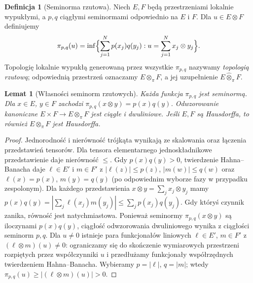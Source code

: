 \documentclass[11pt,a4paper]{article}
\numberwithin{equation}{section}
\theoremstyle{plain}
\newtheorem{lemat}[twierdzenie]{Lemat}
\theoremstyle{definition}
\newtheorem{definicja}[twierdzenie]{Definicja}
\theoremstyle{remark}
\begin{document}
\begin{definicja}[Seminorma rzutowa]
\label{def:pi-seminorm24}
Niech $E,F$ będą przestrzeniami lokalnie wypukłymi, a $p,q$
ciągłymi seminormami odpowiednio na $E$ i $F$. Dla
$u\in E\otimes F$ definiujemy
\[
 \pi_{p,q}(u)=\inf\Bigl\{\sum_{j=1}^N p(x_j)q(y_j):
 u=\sum_{j=1}^Nx_j\otimes y_j\Bigr\}.
\]
Topologię lokalnie wypukłą generowaną przez wszystkie
$\pi_{p,q}$ nazywamy \emph{topologią rzutową};
odpowiednią przestrzeń oznaczamy $E\otimes_\pi F$,
a jej uzupełnienie $E\widehat\otimes_\pi F$.
\end{definicja}

\begin{lemat}[Własności seminorm rzutowych]
\label{lem:pi-properties24}
Każda funkcja $\pi_{p,q}$ jest seminormą. Dla $x\in E$,
$y\in F$ zachodzi $\pi_{p,q}(x\otimes y)=p(x)q(y)$.
Odwzorowanie kanoniczne $E\times F\to E\otimes_\pi F$
jest ciągłe i dwuliniowe. Jeśli $E,F$ są Hausdorffa,
to również $E\otimes_\pi F$ jest Hausdorffa.
\end{lemat}
\begin{proof}
Jednorodność i nierówność trójkąta wynikają ze skalowania
oraz łączenia przedstawień tensorów. Dla tensora elementarnego
jednoskładnikowe przedstawienie daje nierówność $\le$.
Gdy $p(x)q(y)>0$, twierdzenie Hahna--Banacha daje
$\ell\in E'$ i $m\in F'$ z $|\ell(z)|\le p(z)$,
$|m(w)|\le q(w)$ oraz $\ell(x)=p(x)$, $m(y)=q(y)$
(po odpowiednim wyborze fazy w przypadku zespolonym).
Dla każdego przedstawienia $x\otimes y=\sum_jx_j\otimes y_j$
mamy $p(x)q(y)=|\sum_j\ell(x_j)m(y_j)|
\le\sum_jp(x_j)q(y_j)$. Gdy któryś czynnik zanika,
równość jest natychmiastowa. Ponieważ seminormy
$\pi_{p,q}(x\otimes y)$ są iloczynami $p(x)q(y)$,
ciągłość odwzorowania dwuliniowego wynika z ciągłości
seminorm $p,q$. Dla $u\ne0$ istnieje para funkcjonałów
liniowych $\ell\in E'$, $m\in F'$ z
$(\ell\otimes m)(u)\ne0$: ograniczamy się do skończenie
wymiarowych przestrzeni rozpiętych przez współczynniki $u$
i przedłużamy funkcjonały współrzędnych twierdzeniem
Hahna--Banacha. Wybieramy $p=|\ell|$, $q=|m|$;
wtedy $\pi_{p,q}(u)\ge|(\ell\otimes m)(u)|>0$.
\end{proof}
\end{document}
